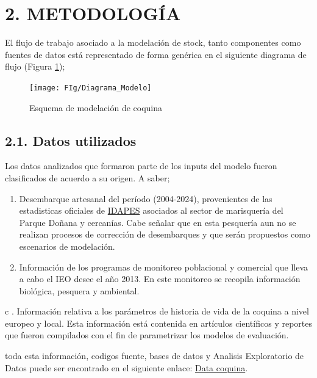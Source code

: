 \documentclass[
]{article}
\begin{document}
\hypertarget{metodologuxeda}{%
\section{2. METODOLOGÍA}\label{metodologuxeda}}

El flujo de trabajo asociado a la modelación de stock, tanto componentes como fuentes de datos está representado de forma genérica en el siguiente diagrama de flujo (Figura \ref{fig:esq});

\begin{figure}

{\centering \texttt{[image: FIg/Diagrama\_Modelo]} 

}

\caption{\label{esq}Esquema de modelación de coquina}\label{fig:esq}
\end{figure}

\pagebreak

\hypertarget{datos-utilizados}{%
\subsection{2.1. Datos utilizados}\label{datos-utilizados}}

Los datos analizados que formaron parte de los inputs del modelo fueron clasificados de acuerdo a su origen. A saber;

\begin{enumerate}
\def\labelenumi{\alph{enumi}.}
\item
  Desembarque artesanal del período (2004-2024), provenientes de las estadisticas oficiales de \href{https://www.juntadeandalucia.es/agriculturaypesca/idapes/servlet/FrontController}{IDAPES} asociados al sector de marisquería del Parque Doñana y cercanías. Cabe señalar que en esta pesquería aun no se realizan procesos de corrección de desembarques y que serán propuestos como escenarios de modelación.
\item
  Información de los programas de monitoreo poblacional y comercial que lleva a cabo el IEO desee el año 2013. En este monitoreo se recopila información biológica, pesquera y ambiental.
\end{enumerate}

c . Información relativa a los parámetros de historia de vida de la coquina a nivel europeo y local. Esta información está contenida en artículos científicos y reportes que fueron compilados con el fin de parametrizar los modelos de evaluación.

toda esta información, codigos fuente, bases de datos y Analisis Exploratorio de Datos puede ser encontrado en el siguiente enlace: \href{https://mauromardones.github.io/EDA_Donux_trunculus_2023/}{Data coquina}.
\end{document}
